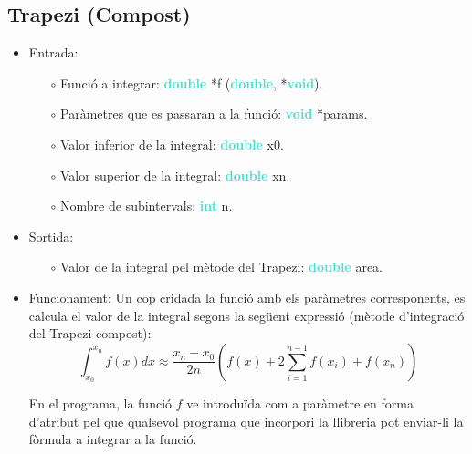 \documentclass[12pt]{article}
\begin{document}
\subsection{Trapezi (Compost)}
\begin{itemize}
    \item Entrada:
    \begin{itemize}
        \item[$\circ$] Funció a integrar: \textbf{\textcolor{Turquoise}{double}} *f (\textbf{\textcolor{Turquoise}{double}},  *\textbf{\textcolor{Turquoise}{void}}).
        \item[$\circ$] Paràmetres que es passaran a la funció: \textbf{\textcolor{Turquoise}{void}} *params.
        \item[$\circ$] Valor inferior de la integral: \textbf{\textcolor{Turquoise}{double}} x0.
        \item[$\circ$] Valor superior de la integral: \textbf{\textcolor{Turquoise}{double}} xn.
        \item[$\circ$] Nombre de subintervals: \textbf{\textcolor{Turquoise}{int}} n.
    \end{itemize}
    \item Sortida:
        \begin{itemize}
            \item[$\circ$] Valor de la integral pel mètode del Trapezi: \textbf{\textcolor{Turquoise}{double}} area.
        \end{itemize}
    \item Funcionament:
    Un cop cridada la funció amb els paràmetres corresponents, es calcula el valor de la integral segons la següent expressió (mètode d'integració del Trapezi compost):
    \begin{equation*}
        \int_{x_0}^{x_n}f(x)dx \approx \frac{x_n-x_0}{2n}\left(f(x) + 2\sum_{i=1}^{n-1}f(x_i) + f(x_n)\right)
    \end{equation*}
    
    En el programa, la funció $f$ ve introduïda com a paràmetre en forma d'atribut pel que qualsevol programa que incorpori la llibreria pot enviar-li la fòrmula a integrar a la funció.
    
\end{itemize}
\newpage
\end{document}
